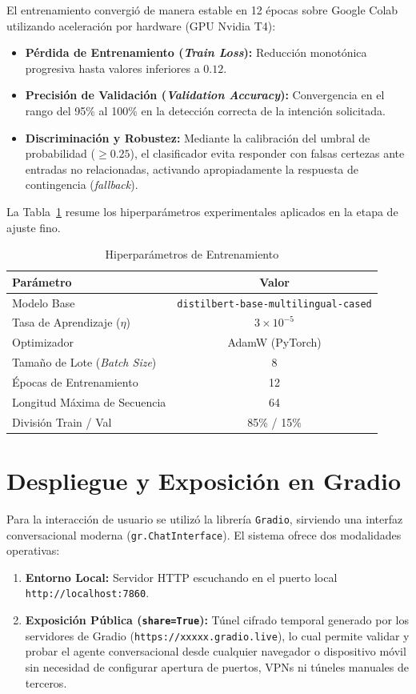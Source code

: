 \documentclass[conference]{IEEEtran}
\begin{document}
El entrenamiento convergió de manera estable en 12 épocas sobre Google Colab utilizando aceleración por hardware (GPU Nvidia T4):
\begin{itemize}
    \item \textbf{Pérdida de Entrenamiento (\textit{Train Loss}):} Reducción monotónica progresiva hasta valores inferiores a $0.12$.
    \item \textbf{Precisión de Validación (\textit{Validation Accuracy}):} Convergencia en el rango del 95\% al 100\% en la detección correcta de la intención solicitada.
    \item \textbf{Discriminación y Robustez:} Mediante la calibración del umbral de probabilidad ($\ge 0.25$), el clasificador evita responder con falsas certezas ante entradas no relacionadas, activando apropiadamente la respuesta de contingencia (\textit{fallback}).
\end{itemize}

La Tabla~\ref{tab:rendimiento} resume los hiperparámetros experimentales aplicados en la etapa de ajuste fino.

\begin{table}[htbp]
\caption{Hiperparámetros de Entrenamiento}
\begin{center}
\begin{tabular}{lc}
\toprule
\textbf{Parámetro} & \textbf{Valor} \\
\midrule
Modelo Base & \texttt{distilbert-base-multilingual-cased} \\
Tasa de Aprendizaje ($\eta$) & $3 \times 10^{-5}$ \\
Optimizador & AdamW (PyTorch) \\
Tamaño de Lote (\textit{Batch Size}) & 8 \\
Épocas de Entrenamiento & 12 \\
Longitud Máxima de Secuencia & 64 \\
División Train / Val & 85\% / 15\% \\
\bottomrule
\end{tabular}
\label{tab:rendimiento}
\end{center}
\end{table}

\section{Despliegue y Exposición en Gradio}
Para la interacción de usuario se utilizó la librería \texttt{Gradio}, sirviendo una interfaz conversacional moderna (\texttt{gr.ChatInterface}). El sistema ofrece dos modalidades operativas:
\begin{enumerate}
    \item \textbf{Entorno Local:} Servidor HTTP escuchando en el puerto local \texttt{http://localhost:7860}.
    \item \textbf{Exposición Pública (\texttt{share=True}):} Túnel cifrado temporal generado por los servidores de Gradio (\texttt{https://xxxxx.gradio.live}), lo cual permite validar y probar el agente conversacional desde cualquier navegador o dispositivo móvil sin necesidad de configurar apertura de puertos, VPNs ni túneles manuales de terceros.
\end{enumerate}
\end{document}
